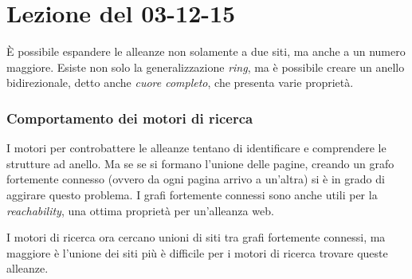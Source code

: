 \section{Lezione del 03-12-15}

\`E possibile espandere le alleanze non solamente a due siti, ma anche a un numero maggiore. Esiste non solo la generalizzazione \textit{ring}, ma \`e possibile creare un anello bidirezionale, detto anche \textit{cuore completo}, che presenta varie propriet\`a.

\subsubsection{Comportamento dei motori di ricerca}I motori per controbattere le alleanze tentano di identificare e comprendere le strutture ad anello. Ma se se si formano l'unione delle pagine, creando un grafo fortemente connesso (ovvero da ogni pagina arrivo a un'altra) si \`e in grado di aggirare questo problema. I grafi fortemente connessi sono anche utili per la \textit{reachability}, una ottima propriet\`a per un'alleanza web.

I motori di ricerca ora cercano unioni di siti tra grafi fortemente connessi, ma maggiore \`e l'unione dei siti pi\`u \`e difficile per i motori di ricerca trovare queste alleanze.

